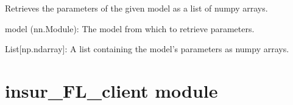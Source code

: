 \documentclass[letterpaper,10pt,english]{sphinxmanual}
\begin{document}
\begin{fulllineitems}
\begin{fulllineitems}
\end{fulllineitems}


\begin{fulllineitems}
\label{\detokenize{architecture:architecture.MultipleRegression.training}}
\pysigstartsignatures
{}
\pysigstopsignatures
\end{fulllineitems}


\end{fulllineitems}


\begin{fulllineitems}
\label{\detokenize{architecture:architecture.get_parameters}}
\pysigstartsignatures
{}
\pysigstopsignatures
\sphinxAtStartPar
Retrieves the parameters of the given model as a list of numpy arrays.
\begin{description}
\sphinxAtStartPar
model (nn.Module): The model from which to retrieve parameters.

\sphinxAtStartPar
List{[}np.ndarray{]}: A list containing the model’s parameters as numpy arrays.

\end{description}

\end{fulllineitems}


\sphinxstepscope


\section{insur\_FL\_client module}
\label{\detokenize{insur_FL_client:module-insur_FL_client}}\label{\detokenize{insur_FL_client:insur-fl-client-module}}\label{\detokenize{insur_FL_client::doc}}
\end{document}
